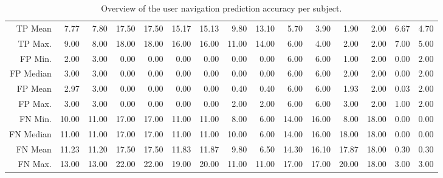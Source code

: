 \begin{table}[ht]
\begin{tabular}{rrrrrrrrrrrrrrr}
  TP Mean & 7.77 & 7.80 & 17.50 & 17.50 & 15.17 & 15.13 & 9.80 & 13.10 & 5.70 & 3.90 & 1.90 & 2.00 & 6.67 & 4.70 \\ 
  TP Max. & 9.00 & 8.00 & 18.00 & 18.00 & 16.00 & 16.00 & 11.00 & 14.00 & 6.00 & 4.00 & 2.00 & 2.00 & 7.00 & 5.00 \\ 
  FP Min. & 2.00 & 3.00 & 0.00 & 0.00 & 0.00 & 0.00 & 0.00 & 0.00 & 6.00 & 6.00 & 1.00 & 2.00 & 0.00 & 2.00 \\ 
  FP Median & 3.00 & 3.00 & 0.00 & 0.00 & 0.00 & 0.00 & 0.00 & 0.00 & 6.00 & 6.00 & 2.00 & 2.00 & 0.00 & 2.00 \\ 
  FP Mean & 2.97 & 3.00 & 0.00 & 0.00 & 0.00 & 0.00 & 0.40 & 0.40 & 6.00 & 6.00 & 1.93 & 2.00 & 0.03 & 2.00 \\ 
  FP Max. & 3.00 & 3.00 & 0.00 & 0.00 & 0.00 & 0.00 & 2.00 & 2.00 & 6.00 & 6.00 & 3.00 & 2.00 & 1.00 & 2.00 \\ 
  FN Min. & 10.00 & 11.00 & 17.00 & 17.00 & 11.00 & 11.00 & 8.00 & 6.00 & 14.00 & 16.00 & 8.00 & 18.00 & 0.00 & 0.00 \\ 
  FN Median & 11.00 & 11.00 & 17.00 & 17.00 & 11.00 & 11.00 & 10.00 & 6.00 & 14.00 & 16.00 & 18.00 & 18.00 & 0.00 & 0.00 \\ 
  FN Mean & 11.23 & 11.20 & 17.50 & 17.50 & 11.83 & 11.87 & 9.80 & 6.50 & 14.30 & 16.10 & 17.87 & 18.00 & 0.30 & 0.30 \\ 
  FN Max. & 13.00 & 13.00 & 22.00 & 22.00 & 19.00 & 20.00 & 11.00 & 11.00 & 17.00 & 17.00 & 20.00 & 18.00 & 3.00 & 3.00 \\ 
   \hline
\end{tabular}
\caption{Overview of the user navigation prediction accuracy per subject.} 
\label{tab:results:rq4:summary:subject}
\end{table}
